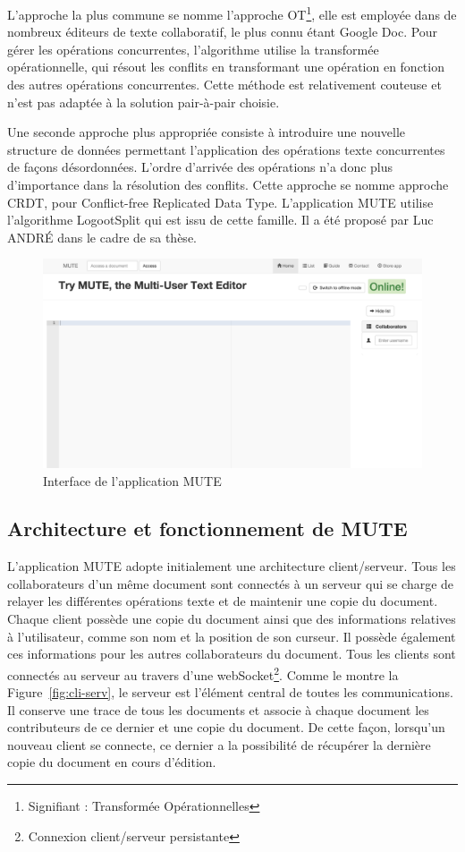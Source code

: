 \documentclass{tnreport}
\begin{document}
L'approche la plus commune se nomme l'approche OT\footnote{Signifiant : Transformée Opérationnelles}, elle est employée dans de nombreux éditeurs de texte collaboratif, le plus connu étant Google Doc. Pour gérer les opérations concurrentes, l'algorithme utilise la transformée opérationnelle, qui résout les conflits en transformant une opération en fonction des autres opérations concurrentes. Cette méthode est relativement couteuse et n'est pas adaptée à la solution pair-à-pair choisie. 

Une seconde approche plus appropriée consiste à introduire une nouvelle structure de données permettant l'application des opérations texte concurrentes de façons désordonnées. L'ordre d'arrivée des opérations n'a donc plus d'importance dans la résolution des conflits. Cette approche se nomme approche CRDT, pour Conflict-free Replicated Data Type. L’application MUTE utilise l'algorithme LogootSplit qui est issu de cette famille. Il a été proposé par Luc ANDRÉ dans le cadre de sa thèse.

\begin{figure}[!h]
  \centering
  \includegraphics[width=14cm]{figures/screenshot-mute}
  \caption{Interface de l'application MUTE}
  \label{fig:screen-mute}
\end{figure}


\subsection{Architecture et fonctionnement de MUTE}

L'application MUTE adopte initialement une architecture client/serveur. Tous les collaborateurs d'un même document sont connectés à un serveur qui se charge de relayer les différentes opérations texte et de maintenir une copie du document. Chaque client possède une copie du document ainsi que des informations relatives à l'utilisateur, comme son nom et la position de son curseur. Il possède également ces informations pour les autres collaborateurs du document. Tous les clients sont connectés au serveur au travers d'une webSocket\footnote{Connexion client/serveur persistante}. Comme le montre la Figure~\ref{fig:cli-serv}, le serveur est l'élément central de toutes les communications. Il conserve une trace de tous les documents et associe à chaque document les contributeurs de ce dernier et une copie du document. De cette façon, lorsqu'un nouveau client se connecte, ce dernier a la possibilité de récupérer la dernière copie du document en cours d'édition. 
\end{document}
